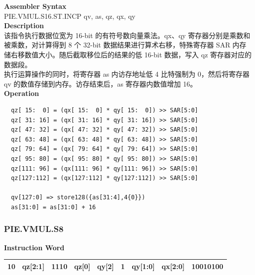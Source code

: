 \textbf{Assembler Syntax} \\
PIE.VMUL.S16.ST.INCP qv, as, qz, qx, qy \\
\textbf{Description} \\
该指令执行数据位宽为 16-bit 的有符号数向量乘法。qx、qy 寄存器分别是乘数和被乘数，对计算得到 8 个 32-bit 数据结果进行算术右移，特殊寄存器 SAR 内存储右移数值大小。随后截取移位后的结果的低 16-bit 数据，写入 qz 寄存器对应的数据段。\\ 执行运算操作的同时，将寄存器 as 内访存地址低 4 比特强制为 0，然后将寄存器 qv 的数值存储到内存。访存结束后，as 寄存器内数值增加 16。\\
\textbf{Operation}
\begin{lstlisting}
  qz[ 15:  0] = (qx[ 15:  0] * qy[ 15:  0]) >> SAR[5:0]
  qz[ 31: 16] = (qx[ 31: 16] * qy[ 31: 16]) >> SAR[5:0]
  qz[ 47: 32] = (qx[ 47: 32] * qy[ 47: 32]) >> SAR[5:0]
  qz[ 63: 48] = (qx[ 63: 48] * qy[ 63: 48]) >> SAR[5:0]
  qz[ 79: 64] = (qx[ 79: 64] * qy[ 79: 64]) >> SAR[5:0]
  qz[ 95: 80] = (qx[ 95: 80] * qy[ 95: 80]) >> SAR[5:0]
  qz[111: 96] = (qx[111: 96] * qy[111: 96]) >> SAR[5:0]
  qz[127:112] = (qx[127:112] * qy[127:112]) >> SAR[5:0]

  qv[127:0] => store128({as[31:4],4{0}})
  as[31:0] = as[31:0] + 16
\end{lstlisting}

\newpage
\subsubsection{PIE.VMUL.S8}\label{instruction:PIEVMULS8}
\setlength\tabcolsep{6pt}
\textbf{Instruction Word} \\
\begin{tabular}{|c|c|c|c|c|c|c|c|c|}
	\hline
	10 & qz[2:1] & 1110 & qz[0] & qy[2] & 1 & qy[1:0] & qx[2:0] & 10010100 \\
	\hline
\end{tabular}

